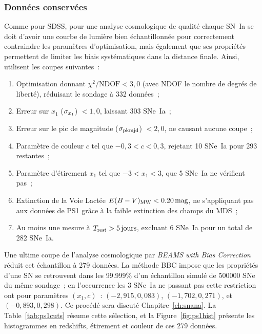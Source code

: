 \documentclass[../main/main.tex]{subfiles}
\begin{document}
\subsubsection{Données conservées}\label{ssec:ps1data}

Comme pour SDSS, pour une analyse cosmologique de qualité chaque SN~Ia se doit
d'avoir une courbe de lumière bien échantillonnée pour correctement contraindre
les paramètres d'optimisation, mais également que ses propriétés permettent de
limiter les biais systématiques dans la distance finale.
Ainsi,~\cite{scolnic2018} utilisent les coupes suivantes~:
\begin{enumerate}
    \item Optimisation donnant $\chi^2/\mathrm{NDOF} < 3,0$ (avec NDOF le nombre
        de degrés de liberté), réduisant le sondage à 332 données~;
    \item Erreur sur $x_1$ ($\sigma_{x_1}$) $< 1,0$, laissant 303 SNe~Ia~;
    \item Erreur sur le pic de magnitude ($\sigma_{\rm pkmjd}$) $< 2,0$, ne causant
        aucune coupe~;
    \item Paramètre de couleur $c$ tel que $-0,3 < c < 0,3$, rejetant 10 SNe~Ia
        pour 293 restantes~;
    \item Paramètre d'étirement $x_1$ tel que $-3 < x_1 < 3$, que 5 SNe~Ia ne
        vérifient pas~;
    \item Extinction de la Voie Lactée $E(B-V)_{\rm MW}< \SI{0,20}{mag}$, ne
        s'appliquant pas aux données de PS1 grâce à la faible extinction des
        champs du MDS~;
    \item Au moins une mesure à $T_{\rm rest} > \SI{5}{jours}$, excluant 6
        SNe~Ia pour un total de 282 SNe~Ia.
\end{enumerate}
Une ultime coupe de l'analyse cosmologique par \textit{BEAMS with Bias
Correction} \citep[BBC,][]{kessler2017} réduit cet échantillon à 279 données. La
méthode BBC impose que les propriétés d'une SN se retrouvent dans les 99.999\%
d'un échantillon simulé de \num{500 000} SNe du même sondage~; en l'occurrence
les 3 SNe~Ia ne passant pas cette restriction ont pour paramètres $(x_1,c)$~:
$(−2,915, 0,083)$, $(−1,702, 0,271)$, et $(−0,893, 0,298)$. Ce procédé sera
discuté Chapitre~\ref{ch:snana}. La Table~\ref{tab:ps1cuts} résume cette
sélection, et la Figure~\ref{fig:ps1hist} présente les histogrammes en
redshifts, étirement et couleur de ces 279 données.
\end{document}
